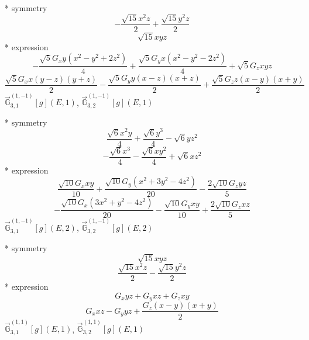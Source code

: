 \documentclass[fleqn,8pt]{jsarticle}
\begin{document}
\noindent\quad ** symmetry
\begin{dmath*}
- \frac{\sqrt{15} x^{2} z}{2} + \frac{\sqrt{15} y^{2} z}{2}
\end{dmath*}
\begin{dmath*}
\sqrt{15} x y z
\end{dmath*}
\noindent\quad ** expression
\begin{dmath*}
- \frac{\sqrt{5} G_{x} y \left(x^{2} - y^{2} + 2 z^{2}\right)}{4} + \frac{\sqrt{5} G_{y} x \left(x^{2} - y^{2} - 2 z^{2}\right)}{4} + \sqrt{5} G_{z} x y z
\end{dmath*}
\begin{dmath*}
\frac{\sqrt{5} G_{x} x \left(y - z\right) \left(y + z\right)}{2} - \frac{\sqrt{5} G_{y} y \left(x - z\right) \left(x + z\right)}{2} + \frac{\sqrt{5} G_{z} z \left(x - y\right) \left(x + y\right)}{2}
\end{dmath*}
\noindent\quad $\vec{\mathbb{G}}_{3,1}^{(1,-1)}[g](E,1)$, $\vec{\mathbb{G}}_{3,2}^{(1,-1)}[g](E,1)$

\noindent\quad ** symmetry
\begin{dmath*}
\frac{\sqrt{6} x^{2} y}{4} + \frac{\sqrt{6} y^{3}}{4} - \sqrt{6} y z^{2}
\end{dmath*}
\begin{dmath*}
- \frac{\sqrt{6} x^{3}}{4} - \frac{\sqrt{6} x y^{2}}{4} + \sqrt{6} x z^{2}
\end{dmath*}
\noindent\quad ** expression
\begin{dmath*}
\frac{\sqrt{10} G_{x} x y}{10} + \frac{\sqrt{10} G_{y} \left(x^{2} + 3 y^{2} - 4 z^{2}\right)}{20} - \frac{2 \sqrt{10} G_{z} y z}{5}
\end{dmath*}
\begin{dmath*}
- \frac{\sqrt{10} G_{x} \left(3 x^{2} + y^{2} - 4 z^{2}\right)}{20} - \frac{\sqrt{10} G_{y} x y}{10} + \frac{2 \sqrt{10} G_{z} x z}{5}
\end{dmath*}
\noindent\quad $\vec{\mathbb{G}}_{3,1}^{(1,-1)}[g](E,2)$, $\vec{\mathbb{G}}_{3,2}^{(1,-1)}[g](E,2)$

\noindent\quad ** symmetry
\begin{dmath*}
\sqrt{15} x y z
\end{dmath*}
\begin{dmath*}
\frac{\sqrt{15} x^{2} z}{2} - \frac{\sqrt{15} y^{2} z}{2}
\end{dmath*}
\noindent\quad ** expression
\begin{dmath*}
G_{x} y z + G_{y} x z + G_{z} x y
\end{dmath*}
\begin{dmath*}
G_{x} x z - G_{y} y z + \frac{G_{z} \left(x - y\right) \left(x + y\right)}{2}
\end{dmath*}
\noindent\quad $\vec{\mathbb{G}}_{3,1}^{(1,1)}[g](E,1)$, $\vec{\mathbb{G}}_{3,2}^{(1,1)}[g](E,1)$
\end{document}
